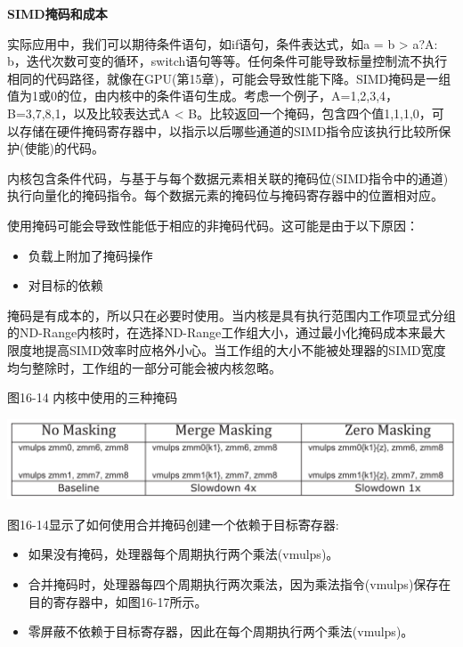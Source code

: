 \hspace*{\fill} \par %
\textbf{SIMD掩码和成本}

实际应用中，我们可以期待条件语句，如if语句，条件表达式，如a = b > a?A: b，迭代次数可变的循环，switch语句等等。任何条件可能导致标量控制流不执行相同的代码路径，就像在GPU(第15章)，可能会导致性能下降。SIMD掩码是一组值为1或0的位，由内核中的条件语句生成。考虑一个例子，A={1,2,3,4}， B={3,7,8,1}，以及比较表达式A < B。比较返回一个掩码，包含四个值{1,1,1,0}，可以存储在硬件掩码寄存器中，以指示以后哪些通道的SIMD指令应该执行比较所保护(使能)的代码。\par

内核包含条件代码，与基于与每个数据元素相关联的掩码位(SIMD指令中的通道)执行向量化的掩码指令。每个数据元素的掩码位与掩码寄存器中的位置相对应。\par

使用掩码可能会导致性能低于相应的非掩码代码。这可能是由于以下原因：\par

\begin{itemize}
	\item 负载上附加了掩码操作
	\item 对目标的依赖
\end{itemize}

掩码是有成本的，所以只在必要时使用。当内核是具有执行范围内工作项显式分组的ND-Range内核时，在选择ND-Range工作组大小，通过最小化掩码成本来最大限度地提高SIMD效率时应格外小心。当工作组的大小不能被处理器的SIMD宽度均匀整除时，工作组的一部分可能会被内核忽略。\par

\hspace*{\fill} \par %
图16-14 内核中使用的三种掩码
\begin{center}
	\includegraphics[width=1.0\textwidth]{content/chapter-16/images/11}
\end{center}

图16-14显示了如何使用合并掩码创建一个依赖于目标寄存器:\par

\begin{itemize}
	\item 如果没有掩码，处理器每个周期执行两个乘法(vmulps)。
	\item 合并掩码时，处理器每四个周期执行两次乘法，因为乘法指令(vmulps)保存在目的寄存器中，如图16-17所示。
	\item 零屏蔽不依赖于目标寄存器，因此在每个周期执行两个乘法(vmulps)。
\end{itemize}

